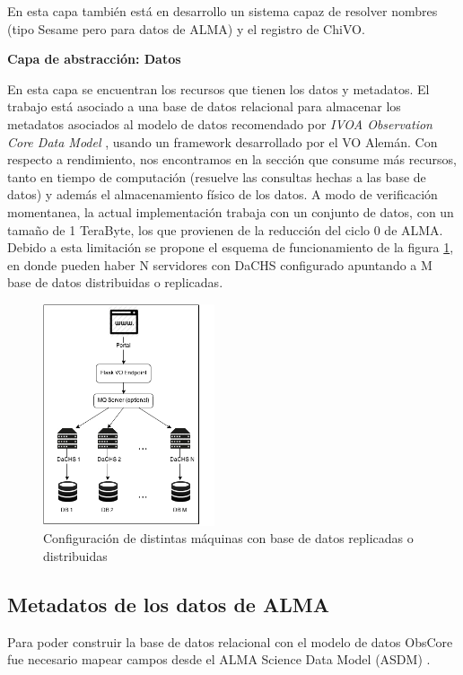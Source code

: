 En esta capa también está en desarrollo un sistema capaz de resolver nombres
(tipo Sesame \cite{sesame} pero para datos de ALMA) y el registro de ChiVO.

\textbf{Capa de abstracción: Datos}

En esta capa se encuentran los recursos que tienen los datos y metadatos.
El trabajo está asociado a una base de datos relacional para almacenar los
metadatos asociados al modelo de datos recomendado por \emph{IVOA Observation Core
Data Model} \cite{louys2011ivoa}, usando un framework desarrollado por el VO Alemán.
Con respecto a rendimiento, nos encontramos en la sección que consume más
recursos, tanto en tiempo de computación (resuelve las consultas hechas a las base
de datos) y además el almacenamiento físico de los datos.
A modo de verificación momentanea,
la actual implementación trabaja con un conjunto de datos, con un tamaño
de 1 TeraByte, los que provienen de la reducción del ciclo 0 de ALMA.
Debido a esta limitación se propone
el esquema de funcionamiento de la figura \ref{fig:dachs}, en donde pueden haber N
servidores con DaCHS configurado apuntando a M base de datos distribuidas o replicadas.

\begin{figure}[ht]
    \centering
    \includegraphics[width=0.45\textwidth]{images/interaccion.png}
    \caption{Configuración de distintas máquinas con base de datos replicadas o distribuidas}
    \label{fig:dachs}
\end{figure}

\subsection{Metadatos de los datos de ALMA}

Para poder construir la base de datos relacional con el modelo de datos ObsCore fue
necesario mapear campos desde el ALMA Science Data Model (ASDM) \cite{viallefond2009sdm}.

